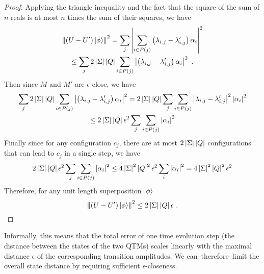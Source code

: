 \begin{theorem}
\begin{proof}
Applying the triangle inequality and the fact that the square of the sum of $n$ reals is at most $n$ times the sum of their squares, we have
\begin{multline}
    \left\lVert(U-U')\ket{\phi}\right\rVert^2
    =\sum_j\left\vert\sum_{i\in P(j)}\left(\lambda_{i,j}-\lambda'_{i,j}\right)\alpha_i\right\vert^2
    \\
    \leq \sum_j2\left\vert\Sigma\right\vert\left\vert Q\right\vert\sum_{i\in P(j)}\left\vert\left(\lambda_{i,j}-\lambda'_{i,j}\right)\alpha_i\right\vert^2
    \ .
\end{multline}
Then since $M$ and $M'$ are $\epsilon$-close, we have
\begin{multline}
    \sum_j2\left\vert\Sigma\right\vert\left\vert Q\right\vert\sum_{i\in P(j)}\left\vert\left(\lambda_{i,j}-\lambda'_{i,j}\right)\alpha_i\right\vert^2
    =2\left\vert\Sigma\right\vert\left\vert Q\right\vert\sum_j\sum_{i\in P(j)}\left\vert\lambda_{i,j}-\lambda'_{i,j}\right\vert^2\left\vert\alpha_i\right\vert^2
    \\
    \leq 2\left\vert\Sigma\right\vert\left\vert Q\right\vert\epsilon^2\sum_j\sum_{i\in P(j)}\left\vert\alpha_i\right\vert^2
\end{multline}
Finally since for any configuration $c_j$, there are at most $2\left\vert\Sigma\right\vert\left\vert Q\right\vert$ configurations that can lead to $c_j$ in a single step, we have
\begin{equation}
    2\left\vert\Sigma\right\vert\left\vert Q\right\vert\epsilon^2\sum_j\sum_{i\in P(j)}\left\vert\alpha_i\right\vert^2
    \leq 4\left\vert\Sigma\right\vert^2\left\vert Q\right\vert^2\epsilon^2\sum_i\left\vert\alpha_i\right\vert^2
    =4\left\vert\Sigma\right\vert^2\left\vert Q\right\vert^2\epsilon^2
\end{equation}
Therefore, for any unit length superposition $\ket{\phi}$
\begin{equation}
    \left\lVert(U-U')\ket{\phi}\right\rVert^2
    \leq 2\left\vert\Sigma\right\vert\left\vert Q\right\vert\epsilon
    \ .
\end{equation}
\end{proof}
\end{theorem}
Informally, this means that the total error of one time evolution step (the distance between the states of the two \acp{QTM}) scales linearly with the maximal distance $\epsilon$ of the corresponding transition amplitudes.
We can--therefore--limit the overall state distance by requiring sufficient $\epsilon$-closeness.

